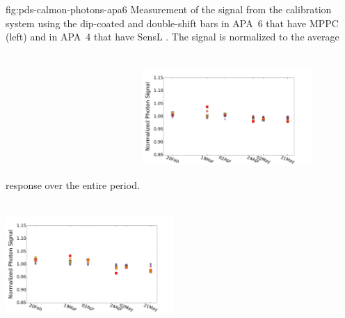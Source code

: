 \begin{dunefigure}
 {fig:pds-calmon-photons-apa6}
 {Measurement of the signal from the calibration system using the dip-coated and double-shift bars in APA~6 that have MPPC  (left) and in APA~4 that have SensL . The signal is normalized to the average response over the entire period.
 }
  \includegraphics[height=5.5cm,width=0.48\textwidth]{graphics/pds-avg-mean-adc-led-apa6-mppc.pdf}
  \includegraphics[height=5.5cm,width=0.48\textwidth]{graphics/pds-avg-mean-adc-led-apa4-sensl.pdf}

\end{dunefigure}
